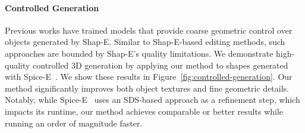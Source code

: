 \paragraph{Controlled Generation}
Previous works have trained models that provide coarse geometric control over objects generated by Shap-E. Similar to Shap-E-based editing methods, such approaches are bounded by Shap-E's quality limitations. We demonstrate high-quality controlled 3D generation by applying our method to shapes generated with Spice-E~\cite{sella2024spicee}.
We show these results in Figure~\ref{fig:controlled-generation}. Our method significantly improves both object textures and fine geometric details. Notably, while Spice-E~\cite{sella2024spicee} uses an SDS-based approach as a refinement step, which impacts its runtime, our method achieves comparable or better results while running an order of magnitude faster.

% 


\vspace{-3pt}   